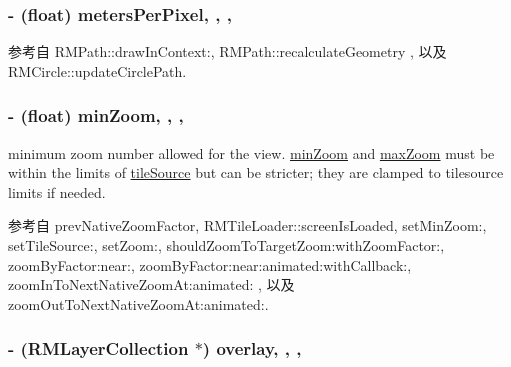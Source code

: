 \hypertarget{interface_r_m_map_contents_a23204276fe6140d07d3671e9b90157dc}{
\subsubsection[{meters\-Per\-Pixel}]{\setlength{\rightskip}{0pt plus 5cm}-\/ (float) meters\-Per\-Pixel\hspace{0.3cm}{\ttfamily [read]}, {\ttfamily [write]}, {\ttfamily [atomic]}, {\ttfamily [assign]}}}\label{interface_r_m_map_contents_a23204276fe6140d07d3671e9b90157dc}


参考自 R\-M\-Path\-::draw\-In\-Context\-:, R\-M\-Path\-::recalculate\-Geometry , 以及 R\-M\-Circle\-::update\-Circle\-Path.

\hypertarget{interface_r_m_map_contents_ab434ff9dc95d209ad2d53cf8d0f1703b}{
\subsubsection[{min\-Zoom}]{\setlength{\rightskip}{0pt plus 5cm}-\/ (float) min\-Zoom\hspace{0.3cm}{\ttfamily [read]}, {\ttfamily [write]}, {\ttfamily [nonatomic]}, {\ttfamily [assign]}}}\label{interface_r_m_map_contents_ab434ff9dc95d209ad2d53cf8d0f1703b}


minimum zoom number allowed for the view. \hyperlink{interface_r_m_map_contents_ab434ff9dc95d209ad2d53cf8d0f1703b}{min\-Zoom} and \hyperlink{interface_r_m_map_contents_afa0fef34433cbc987d0346dccbd151a1}{max\-Zoom} must be within the limits of \hyperlink{interface_r_m_map_contents_afdc2f45aee8bcc5633182450fdea0cfc}{tile\-Source} but can be stricter; they are clamped to tilesource limits if needed. 



参考自 prev\-Native\-Zoom\-Factor, R\-M\-Tile\-Loader\-::screen\-Is\-Loaded, set\-Min\-Zoom\-:, set\-Tile\-Source\-:, set\-Zoom\-:, should\-Zoom\-To\-Target\-Zoom\-:with\-Zoom\-Factor\-:, zoom\-By\-Factor\-:near\-:, zoom\-By\-Factor\-:near\-:animated\-:with\-Callback\-:, zoom\-In\-To\-Next\-Native\-Zoom\-At\-:animated\-: , 以及 zoom\-Out\-To\-Next\-Native\-Zoom\-At\-:animated\-:.

\hypertarget{interface_r_m_map_contents_ae5474cf3d2df7f969aec0944ac02134c}{
\subsubsection[{overlay}]{\setlength{\rightskip}{0pt plus 5cm}-\/ ({\bf R\-M\-Layer\-Collection} $\ast$) overlay\hspace{0.3cm}{\ttfamily [read]}, {\ttfamily [write]}, {\ttfamily [atomic]}, {\ttfamily [retain]}}}\label{interface_r_m_map_contents_ae5474cf3d2df7f969aec0944ac02134c}


